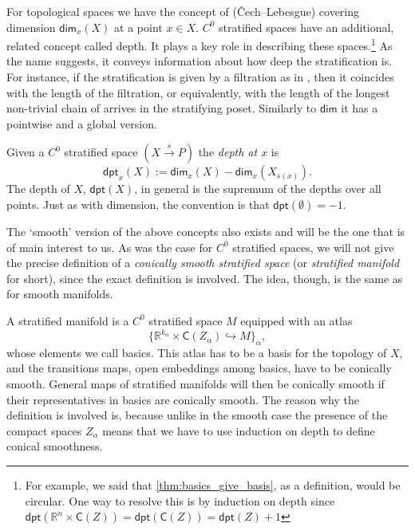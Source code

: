 \documentclass[../text]{subfiles}
\begin{document}
For topological spaces we have the concept of (\v{C}ech--Lebesgue) covering dimension $\mathsf{dim}_x (X)$ at a point $x \in X$. $C^0$ stratified spaces have an additional, related concept called depth. It plays a key role in describing these spaces.\footnote{For example, we said that \cref{thm:basics_give_basis}, as a definition, would be circular. One way to resolve this is by induction on depth since $\mathsf{dpt} (\mathbb{R}^n \times \mathsf{C}(Z)) = \mathsf{dpt} (\mathsf{C}(Z)) = \mathsf{dpt} (Z) + 1$} As the name suggests, it conveys information about how deep the stratification is. For instance, if the stratification is given by a filtration as in , then it coincides with the length of the filtration, or equivalently, with the length of the longest non-trivial chain of arrives in the stratifying poset. Similarly to $\mathsf{dim}$ it has a pointwise and a global version.

\begin{definition}
    Given a $C^0$ stratified space $(X \xrightarrow{s} P)$ the \emph{depth at $x$} is
    \begin{equation}
        \mathsf{dpt}_x (X) := \mathsf{dim}_x (X) - \mathsf{dim}_x (X_{s(x)}).
    \end{equation}
    The depth of $X$, $\mathsf{dpt} (X)$, in general is the supremum of the depths over all points. Just as with dimension, the convention is that $\mathsf{dpt}(\emptyset) = -1$.
\end{definition}

The `smooth' version of the above concepts also exists and will be the one that is of main interest to us. As was the case for $C^0$ stratified spaces, we will not give the precise definition of a \emph{conically smooth stratified space} (or \emph{stratified manifold} for short), since the exact definition is involved. The idea, though, is the same as for smooth manifolds.

A stratified manifold is a $C^0$ stratified space $M$ equipped with an atlas
%
\begin{equation}
    \{\mathbb{R}^{k_\alpha} \times \mathsf{C}(Z_\alpha) \hookrightarrow M\}_\alpha,
\end{equation}
%
whose elements we call basics. This atlas has to be a basis for the topology of $X$, and the transitions maps, open embeddings among basics, have to be conically smooth. General maps of stratified manifolds will then be conically smooth if their representatives in basics are conically smooth.
The reason why the definition is involved is, because unlike in the smooth case the presence of the compact spaces $Z_\alpha$ means that we have to use induction on depth to define conical smoothness.
\end{document}
